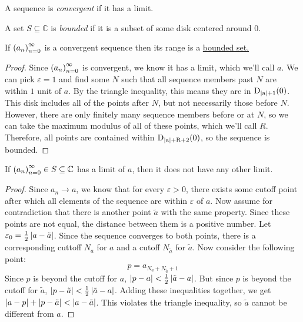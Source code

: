 \begin{definition}
A sequence is \emph{convergent} if it has a limit.
\end{definition}
\begin{definition}
A set $S \subseteq \mathbb{C}$ is \emph{bounded} if it is a subset of some disk centered around $0$.
\end{definition}
\begin{lemma}
If $\seq{a}$ is a convergent sequence then its range is a \hyperlink{Bounded Set}{bounded set.}
\end{lemma}
\begin{proof}
Since $\seq{a}$ is convergent, we know it has a limit, which we'll call $a$. We can pick $\varepsilon = 1$ and find some $N$ such that all sequence members past $N$ are within $1$ unit of $a$. By the triangle inequality, this means they are in $\disk{0}{\modulus{a}+1}$. This disk includes all of the points after $N$, but not necessarily those before $N$. However, there are only finitely many sequence members before or at $N$, so we can take the maximum modulus of all of these points, which we'll call $R$. Therefore, all points are contained within $\disk{0}{\modulus{a}+R+2}$, so the sequence is bounded.
\end{proof}
\begin{theorem}
If $\seq{a} \in S \subseteq \mathbb{C}$ has a limit of $a$, then it does not have any other limit.
\end{theorem}
\begin{proof}
Since $a_n \to a$, we know that for every $\varepsilon > 0$, there exists some cutoff point after which all elements of the sequence are within $\varepsilon$ of $a$. Now assume for contradiction that there is another point $\tilde{a}$ with the same property. Since these points are not equal, the distance between them is a positive number. Let $\varepsilon_0 = \frac{1}{2}\modulus{a-\tilde{a}}$. Since the sequence converges to both points, there is a corresponding cuttoff $N_{a}$ for $a$ and a cutoff $N_{\tilde{a}}$ for $\tilde{a}$. Now consider the following point:
\begin{equation*} p = a_{N_{a}+N_{\tilde{a}}+1} \end{equation*}
Since $p$ is beyond the cutoff for $a$, $\modulus{p-a}<\frac{1}{2}\modulus{\tilde{a}-a}$. But since $p$ is beyond the cutoff for $\tilde{a}$, $\modulus{p-\tilde{a}} < \frac{1}{2}\modulus{\tilde{a}-a}$. Adding these inequalities together, we get $\modulus{a-p}+\modulus{p-\tilde{a}} < \modulus{a-\tilde{a}}$. This violates the triangle inequality, so $\tilde{a}$ cannot be different from $a$.
\end{proof}
